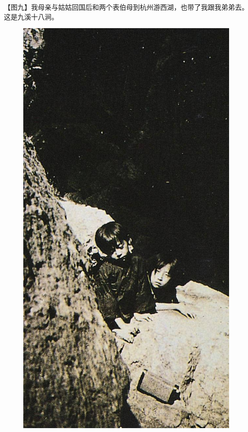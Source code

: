 \clearpage
\par 【图九】我母亲与姑姑回国后和两个表伯母到杭州游西湖，也带了我跟我弟弟去。这是九溪十八涧。
\begin{figure}[htb]
    \centering %
    \includegraphics[scale=0.4]{picture/对照记9.jpeg}
\end{figure}

